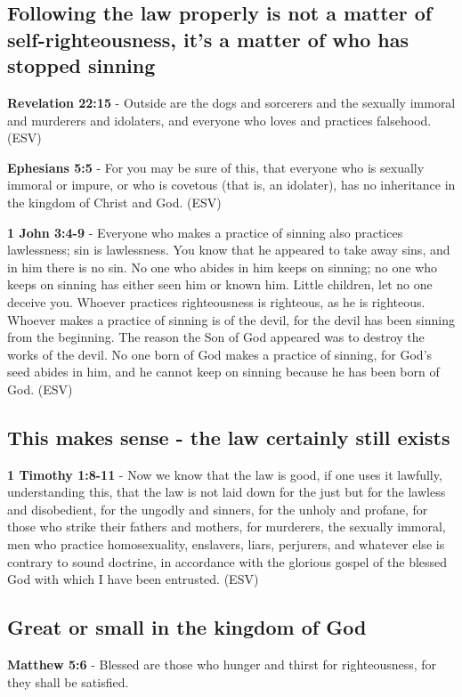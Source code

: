\documentclass[11pt]{article}
\begin{document}
\subsection{Following the law properly is not a matter of self-righteousness, it's a matter of who has stopped sinning}
\label{sec:org614f256}
\textbf{Revelation 22:15} -  Outside are the dogs and sorcerers and the sexually immoral and murderers and idolaters, and everyone who loves and practices falsehood.  (ESV)

\textbf{Ephesians 5:5} -  For you may be sure of this, that everyone who is sexually immoral or impure, or who is covetous (that is, an idolater), has no inheritance in the kingdom of Christ and God.  (ESV)

\textbf{1 John 3:4-9} -  Everyone who makes a practice of sinning also practices lawlessness; sin is lawlessness.  You know that he appeared to take away sins, and in him there is no sin.  No one who abides in him keeps on sinning; no one who keeps on sinning has either seen him or known him.  Little children, let no one deceive you.  Whoever practices righteousness is righteous, as he is righteous.  Whoever makes a practice of sinning is of the devil, for the devil has been sinning from the beginning.  The reason the Son of God appeared was to destroy the works of the devil.  No one born of God makes a practice of sinning, for God's seed abides in him, and he cannot keep on sinning because he has been born of God.  (ESV)

\subsection{This makes sense - the law certainly still exists}
\label{sec:org99405f0}
\textbf{1 Timothy 1:8-11} -  Now we know that the law is good, if one uses it lawfully, understanding this, that the law is not laid down for the just but for the lawless and disobedient, for the ungodly and sinners, for the unholy and profane, for those who strike their fathers and mothers, for murderers, the sexually immoral, men who practice homosexuality, enslavers, liars, perjurers, and whatever else is contrary to sound doctrine, in accordance with the glorious gospel of the blessed God with which I have been entrusted.  (ESV)

\subsection{Great or small in the kingdom of God}
\label{sec:orgb58d02c}
\textbf{Matthew 5:6} - Blessed are those who hunger and thirst for righteousness, for they shall be satisfied.
\end{document}
